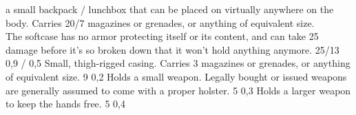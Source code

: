 \begin{multicols}{2}
{        a small backpack / lunchbox that can be placed on virtually anywhere on the body.
        Carries 20/7 magazines or grenades, or anything of equivalent size.\\
        The softcase has no armor protecting itself or its content,
        and can take 25 damage before it's so broken down
        that it won't hold anything anymore.}
    {25/13}
    {0,9 / 0,5}
    {Small, thigh-rigged casing.
        Carries 3 magazines or grenades, or anything of equivalent size.}
    {9}
    {0,2}
    {Holds a small weapon.
        Legally bought or issued weapons are generally assumed to come with a proper holster.}
    {5}
    {0,3}
    {Holds a larger weapon to keep the hands free.}
    {5}
    {0,4}
\end{multicols}

